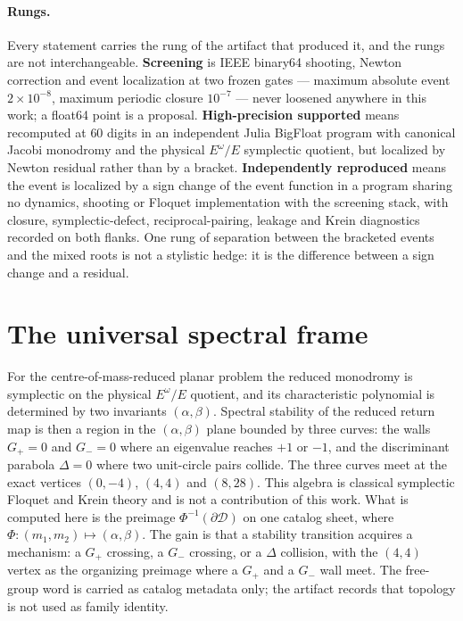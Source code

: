 \documentclass[11pt]{article}
\begin{document}
\paragraph{Rungs.} Every statement carries the rung of the artifact that produced it, and the rungs
are not interchangeable. \textbf{Screening} is IEEE binary64 shooting, Newton correction and event
localization at two frozen gates --- maximum absolute event $2\times10^{-8}$, maximum periodic
closure $10^{-7}$ --- never loosened anywhere in this work; a float64 point is a proposal.
\textbf{High-precision supported} means recomputed at $60$ digits in an independent Julia BigFloat
program with canonical Jacobi monodromy and the physical $E^{\omega}/E$ symplectic quotient, but
localized by Newton residual rather than by a bracket. \textbf{Independently reproduced} means the
event is localized by a sign change of the event function in a program sharing no dynamics, shooting
or Floquet implementation with the screening stack, with closure, symplectic-defect,
reciprocal-pairing, leakage and Krein diagnostics recorded on both flanks. One rung of separation
between the bracketed events and the mixed roots is not a stylistic hedge: it is the difference
between a sign change and a residual.

\section{The universal spectral frame}

For the centre-of-mass-reduced planar problem the reduced monodromy is symplectic on the physical
$E^{\omega}/E$ quotient, and its characteristic polynomial is determined by two invariants
$(\alpha,\beta)$. Spectral stability of the reduced return map is then a region in the
$(\alpha,\beta)$ plane bounded by three curves: the walls $G_+=0$ and $G_-=0$ where an eigenvalue
reaches $+1$ or $-1$, and the discriminant parabola $\Delta=0$ where two unit-circle pairs collide.
The three curves meet at the exact vertices $(0,-4)$, $(4,4)$ and $(8,28)$. This algebra is
classical symplectic Floquet and Krein theory \cite{yakubovich1975,frauenfelder2023symplectic} and
is not a contribution of this work. What is computed here is the preimage
$\Phi^{-1}(\partial\mathcal{D})$ on one catalog sheet, where $\Phi:(m_1,m_2)\mapsto(\alpha,\beta)$.
The gain is that a stability transition acquires a mechanism: a $G_+$ crossing, a $G_-$ crossing, or
a $\Delta$ collision, with the $(4,4)$ vertex as the organizing preimage where a $G_+$ and a $G_-$
wall meet. The free-group word is carried as catalog metadata only; the artifact records that
topology is not used as family identity.
\end{document}
